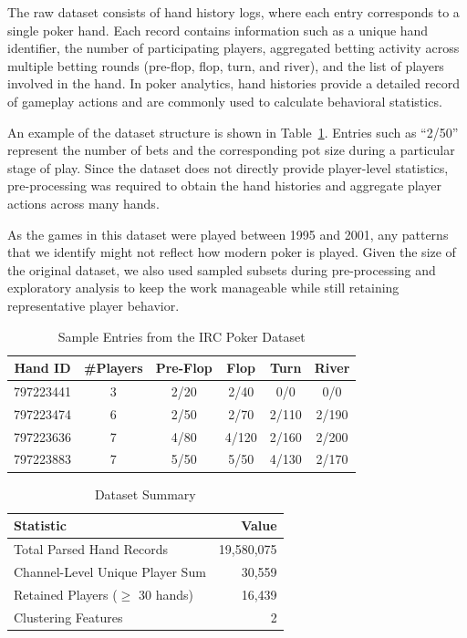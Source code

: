 \documentclass[sigconf]{acmart}
\begin{document}
The raw dataset consists of hand history logs, where each entry corresponds to a single poker hand. Each record contains information such as a unique hand identifier, the number of participating players, aggregated betting activity across multiple betting rounds (pre-flop, flop, turn, and river), and the list of players involved in the hand. In poker analytics, hand histories provide a detailed record of gameplay actions and are commonly used to calculate behavioral statistics. 

An example of the dataset structure is shown in Table~\ref{tab:dataset_sample}. Entries such as ``2/50'' represent the number of bets and the corresponding pot size during a particular stage of play. Since the dataset does not directly provide player-level statistics, pre-processing was required to obtain the hand histories and aggregate player actions across many hands. 

As the games in this dataset were played between 1995 and 2001, any patterns that we identify might not reflect how modern poker is played. Given the size of the original dataset, we also used sampled subsets during pre-processing and exploratory analysis to keep the work manageable while still retaining representative player behavior. 

\begin{table}[t]
\centering
\small
\caption{Sample Entries from the IRC Poker Dataset}
\label{tab:dataset_sample}
\begin{tabular}{c c c c c c}
\toprule
Hand ID & \#Players & Pre-Flop & Flop & Turn & River \\
\midrule
797223441 & 3 & 2/20 & 2/40 & 0/0 & 0/0 \\
797223474 & 6 & 2/50 & 2/70 & 2/110 & 2/190 \\
797223636 & 7 & 4/80 & 4/120 & 2/160 & 2/200 \\
797223883 & 7 & 5/50 & 5/50 & 4/130 & 2/170 \\
\bottomrule
\end{tabular}
\end{table}

\begin{table}[t]
  \caption{Dataset Summary}
  \label{tab:dataset-summary}
  \centering
  \begin{tabular}{lr}
    \toprule
    Statistic & Value \\
    \midrule
    Total Parsed Hand Records & 19,580,075 \\
    Channel-Level Unique Player Sum & 30,559 \\
    Retained Players ($\geq$ 30 hands) & 16,439 \\
    Clustering Features & 2 \\
    \bottomrule
  \end{tabular}
\end{table}
\end{document}

